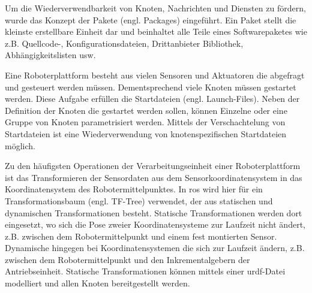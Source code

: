 Um die Wiederverwendbarkeit von Knoten, Nachrichten und Diensten zu fördern, wurde das Konzept der Pakete (engl. Packages) eingeführt. Ein Paket stellt die kleinste erstellbare Einheit dar und beinhaltet alle Teile eines Softwarepaketes wie z.B. Quellcode-, Konfigurationsdateien, Drittanbieter Bibliothek, Abhängigkeitslisten usw.

Eine Roboterplattform besteht aus vielen Sensoren und Aktuatoren die abgefragt und gesteuert werden müssen. Dementsprechend viele Knoten müssen gestartet werden. Diese Aufgabe erfüllen die Startdateien (engl. Launch-Files). Neben der Definition der Knoten die gestartet werden sollen, können Einzelne oder eine Gruppe von Knoten parametrisiert werden. Mittels der Verschachtelung von Startdateien ist eine Wiederverwendung von knotenspezifischen Startdateien möglich.

Zu den häufigsten Operationen der Verarbeitungseinheit einer Roboterplattform ist das Transformieren der Sensordaten aus dem Sensorkoordinatensystem in das Koordinatensystem des Robotermittelpunktes. In \Gls{ros} wird hier für ein Transformationsbaum (engl. TF-Tree) verwendet, der aus statischen und dynamischen Transformationen besteht. Statische Transformationen werden dort eingesetzt, wo sich die Pose zweier Koordinatensysteme zur Laufzeit nicht ändert, z.B. zwischen dem Robotermittelpunkt und einem fest montierten Sensor. Dynamische hingegen bei Koordinatensystemen die sich zur Laufzeit ändern, z.B. zwischen dem Robotermittelpunkt und den Inkrementalgebern der Antriebseinheit. Statische Transformationen können mittels einer \Gls{urdf}-Datei modelliert und allen Knoten bereitgestellt werden.

